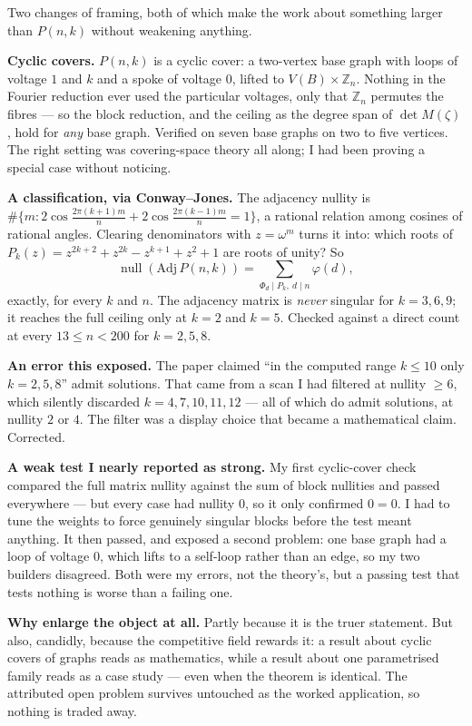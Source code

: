 \documentclass[12pt]{article}
\begin{document}
Two changes of framing, both of which make the work about something larger than
$P(n,k)$ without weakening anything.

\textbf{Cyclic covers.} $P(n,k)$ is a cyclic cover: a two-vertex base graph
with loops of voltage $1$ and $k$ and a spoke of voltage $0$, lifted to
$V(B)\times\mathbb Z_n$. Nothing in the Fourier reduction ever used the
particular voltages, only that $\mathbb Z_n$ permutes the fibres --- so the
block reduction, and the ceiling as the degree span of $\det M(\zeta)$, hold
for \emph{any} base graph. Verified on seven base graphs on two to five
vertices. The right setting was covering-space theory all along; I had been
proving a special case without noticing.

\textbf{A classification, via Conway--Jones.} The adjacency nullity is
$\#\{m: 2\cos\frac{2\pi(k+1)m}{n}+2\cos\frac{2\pi(k-1)m}{n}=1\}$, a rational
relation among cosines of rational angles. Clearing denominators with
$z=\omega^m$ turns it into: which roots of
$P_k(z)=z^{2k+2}+z^{2k}-z^{k+1}+z^2+1$ are roots of unity? So
\[
  \operatorname{null}(\mathrm{Adj}\,P(n,k))=\sum_{\Phi_d\mid P_k,\ d\mid n}\varphi(d),
\]
exactly, for every $k$ and $n$. The adjacency matrix is \emph{never} singular
for $k=3,6,9$; it reaches the full ceiling only at $k=2$ and $k=5$. Checked
against a direct count at every $13\le n<200$ for $k=2,5,8$.

\textbf{An error this exposed.} The paper claimed ``in the computed range
$k\le10$ only $k=2,5,8$'' admit solutions. That came from a scan I had filtered
at nullity $\ge6$, which silently discarded $k=4,7,10,11,12$ --- all of which do
admit solutions, at nullity $2$ or $4$. The filter was a display choice that
became a mathematical claim. Corrected.

\textbf{A weak test I nearly reported as strong.} My first cyclic-cover check
compared the full matrix nullity against the sum of block nullities and passed
everywhere --- but every case had nullity $0$, so it only confirmed $0=0$. I had
to tune the weights to force genuinely singular blocks before the test meant
anything. It then passed, and exposed a second problem: one base graph had a
loop of voltage $0$, which lifts to a self-loop rather than an edge, so my two
builders disagreed. Both were my errors, not the theory's, but a passing test
that tests nothing is worse than a failing one.

\textbf{Why enlarge the object at all.} Partly because it is the truer
statement. But also, candidly, because the competitive field rewards it: a
result about cyclic covers of graphs reads as mathematics, while a result about
one parametrised family reads as a case study --- even when the theorem is
identical. The attributed open problem survives untouched as the worked
application, so nothing is traded away.
\end{document}
